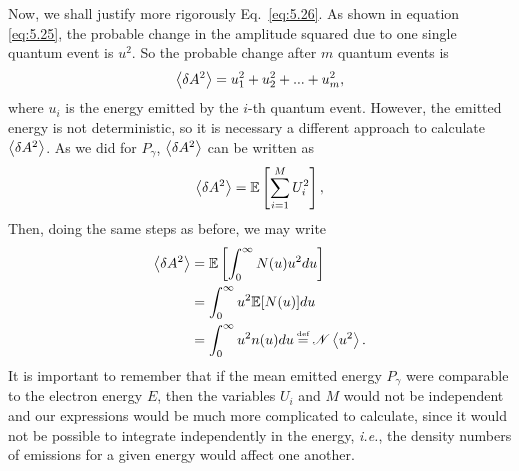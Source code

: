 \documentclass[../sands-adaptation.tex]{subfiles}
\begin{document}
Now, we shall justify more rigorously Eq.~\eqref{eq:5.26}. As shown in equation \eqref{eq:5.25}, the probable change in the amplitude squared due to one single quantum event is $u^2$. So the probable change after $m$ quantum events is
\begin{align}
	\left< \delta A^2 \right> = u_1^2 + u_2^2 + ... + u_m^2,
\end{align}
where $u_i$ is the energy emitted by the $i$-th quantum event. However, the emitted energy is not deterministic, so it is necessary a different approach to calculate $\left< \delta A^2 \right>$.
As we did for $P_\gamma$, $\left< \delta A^2 \right>$ can be written as
\begin{align}
	\left< \delta A^2 \right> = \mathbb{E} \left[ \sum_{i=1}^M U_i^2 \right],
\end{align}
Then, doing the same steps as before, we may write
\begin{align*}
	\mean{\delta A^2} &= \mathbb{E}\left[ \int_0^\infty N(u) u^2 du \right]\\
    		&= \int_0^\infty u^2 \mathbb{E}[N(u)] du\\
            &= \int_0^\infty u^2 n(u) du \bydef \mathscr{N} \mean{u^2}.
\end{align*}
It is important to remember that if the mean emitted energy $P_\gamma$ were comparable to the electron energy $E$, then the variables $U_i$ and $M$ would not be independent and our expressions would be much more complicated to calculate, since it would not be possible to integrate independently in the energy, \textit{i.e.}, the density numbers of emissions for a given energy would affect one another.
\end{document}
